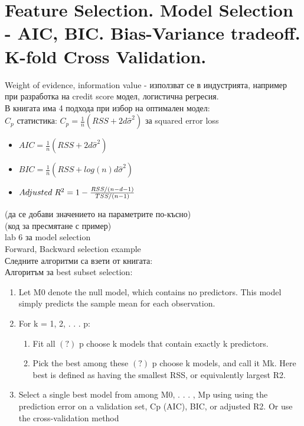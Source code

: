 	\section{Feature Selection. Model Selection - AIC, BIC. Bias-Variance tradeoff. K-fold Cross Validation.} 
	Weight of evidence, information value - използват се в индустрията, например при разработка на credit score модел, логистична регресия. \\
	В книгата има 4 подхода при избор на оптимален модел: \\
	$C_p$ статистика: $C_p = \frac{1}{n}(RSS + 2d \hat \sigma^2)$ за squared error loss
	\begin{itemize}
		\item $AIC = \frac{1}{n}(RSS + 2d \hat \sigma^2)$
		\item $BIC = \frac{1}{n}(RSS + log(n) d \hat \sigma^2)$
		\item $Adjusted \hspace{0.1cm} R^2 = 1 - \frac{RSS/(n-d-1)}{TSS/(n-1)} $
	\end{itemize}
	(да се добави значението на параметрите по-късно) \\
	(код за пресмятане с пример) \\
	

	lab 6 за model selection \\
	Forward, Backward selection example \\
	Следните алгоритми са взети от книгата: \\
	Алгоритъм за best subset selection: 
	\begin{enumerate}
		\item Let M0 denote the null model, which contains no predictors. This
		model simply predicts the sample mean for each observation.
		\item For k = 1, 2, . . . p: 
			\begin{enumerate}
				\item Fit all $(?)$ p choose k models that contain exactly k predictors.
				\item Pick the best among these  $(?)$ p choose k models, and call it Mk. Here best
				is defined as having the smallest RSS, or equivalently largest R2.
			\end{enumerate}
		\item Select a single best model from among M0, . . . , Mp using using the
		prediction error on a validation set, Cp (AIC), BIC, or adjusted R2.
		Or use the cross-validation method
	\end{enumerate}
	
